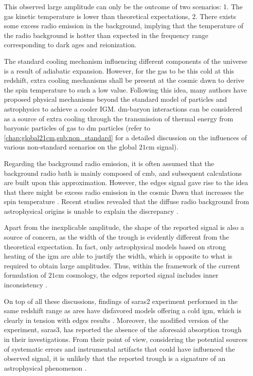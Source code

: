 \documentclass[12pt, TexShade, letterpaper]{report}
\begin{document}
 This observed large amplitude can only be the outcome of two scenarios: 1. The gas kinetic temperature is lower than theoretical expectations, 2. There exists some excess radio emission in the background, implying that the temperature of the radio background is hotter than expected in the frequency range corresponding to dark ages and reionization. \par
 The standard cooling mechanism influencing different components of the universe is a result of adiabatic expansion. However, for the gas to be this cold at this redshift, extra cooling mechanisms shall be present at the cosmic dawn to derive the spin temperature to such a low value. Following this idea, many authors have proposed physical mechanisms beyond the standard model of particles and astrophysics to achieve a cooler IGM. \gls{dm}-baryon interactions can be considered as a source of extra cooling through the transmission of thermal energy from baryonic particles of gas to \gls{dm} particles \cite{dm_edges_1, dm_edges_2, dm_edges_3, dm_edges_4, dm_edges_5, dm_edges_6} (refer to \ref{chap:global21cm,sub:non_standard} for a detailed discussion on the influences of various non-standard scenarios on the global $\mathrm{21cm}$ signal).\par
 Regarding the background radio emission, it is often assumed that the background radio bath is mainly composed of \gls{cmb}, and subsequent calculations are built upon this approximation. However, the \gls{edges} signal gave rise to the idea that there might be excess radio emission in the cosmic Dawn that increases the spin temperature \cite{excess_radio}. Recent studies revealed that the diffuse radio background from astrophysical origins is unable to explain the discrepancy \cite{excess_radio, thesis_shedding}.\par
 Apart from the inexplicable amplitude, the shape of the reported signal is also a source of concern, as the width of the trough is evidently different from the theoretical expectation. In fact, only astrophysical models based on strong heating of the \gls{igm} are able to justify the width, which is opposite to what is required to obtain large amplitudes. Thus, within the framework of the current formulation of $\mathrm{21cm}$ cosmology, the \gls{edges} reported signal includes inner inconsistency \cite{edges_inconsistent_inner, thesis_shedding}.\par
 On top of all these discussions, findings of \gls{saras}2 experiment performed in the same redshift range as \gls{ares} have disfavored models offering a cold \gls{igm}, which is clearly in tension with \gls{edges} results \cite{saras_2_constrains, saras_2_results}. Moreover, the modified version of the experiment, \gls{saras}3, has reported the absence of the aforesaid absorption trough in their investigations. From their point of view, considering the potential sources of systematic errors and instrumental artifacts that could have influenced the observed signal, it is unlikely that the reported trough is a signature of an astrophysical phenomenon \cite{saras_3_results, saras_curse_edges}.\par
\end{document}
